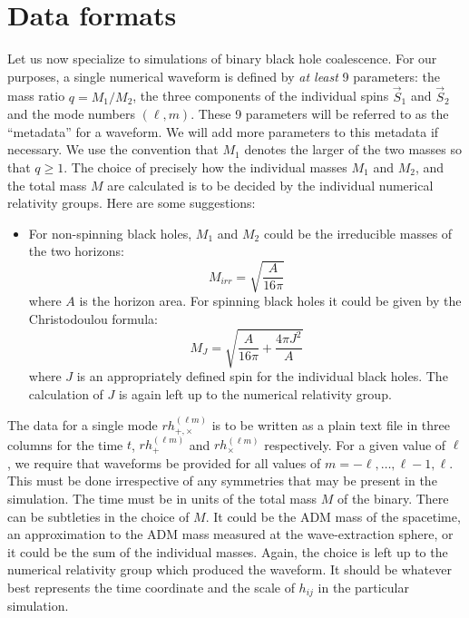 \documentclass[10pt]{ligodcc}
\begin{document}
\section{Data formats}
\label{sec:format}


Let us now specialize to simulations of binary black hole coalescence.
For our purposes, a single numerical waveform is defined by \emph{at
  least} 9 parameters: the mass ratio $q = M_1/M_2$, the three
components of the individual spins $\vec{S}_1$ and $\vec{S}_2$ and the
mode numbers $(\ell,m)$.  These 9 parameters will be referred to as
the ``metadata'' for a waveform.  We will add more parameters to this
metadata if necessary. We use the convention that $M_1$ denotes the
larger of the two masses so that $q\geq 1$.  The choice of precisely
how the individual masses $M_1$ and $M_2$, and the total mass $M$ are
calculated is to be decided by the individual numerical relativity
groups. Here are some suggestions:
\begin{itemize}
\item For non-spinning black holes, $M_1$ and $M_2$ could be the
irreducible masses of the two horizons:
\begin{equation}
  \label{eq:12}
  M_{irr} = \sqrt{\frac{A}{16\pi}}
\end{equation}
where $A$ is the horizon area.  For spinning black holes it could be
given by the Christodoulou formula:
\begin{equation}
  \label{eq:13}
  M_{J} = \sqrt{\frac{A}{16\pi} + \frac{4\pi J^2}{A}}
\end{equation}
where $J$ is an appropriately defined spin for the individual black
holes.  The calculation of $J$ is again left up to the numerical
relativity group.
\end{itemize}

The data for a single mode $rh_{+,\times}^{(\ell m)}$ is to be written as a
plain text file in three columns for the time $t$, $rh_+^{(\ell m)}$ and
$rh_\times^{(\ell m)}$ respectively.  For a given value of $\ell$, we require
that waveforms be provided for all values of
$m=-\ell,\ldots,\ell-1,\ell$.  This must be done irrespective of any
symmetries that may be present in the simulation.  The time must be in
units of the total mass $M$ of the binary.  There can be subtleties in
the choice of $M$.  It could be the ADM mass of the spacetime, an
approximation to the ADM mass measured at the wave-extraction sphere,
or it could be the sum of the individual masses.  Again, the choice is
left up to the numerical relativity group which produced the waveform.
It should be whatever best represents the time coordinate and the
scale of $h_{ij}$ in the particular simulation.
\end{document}
